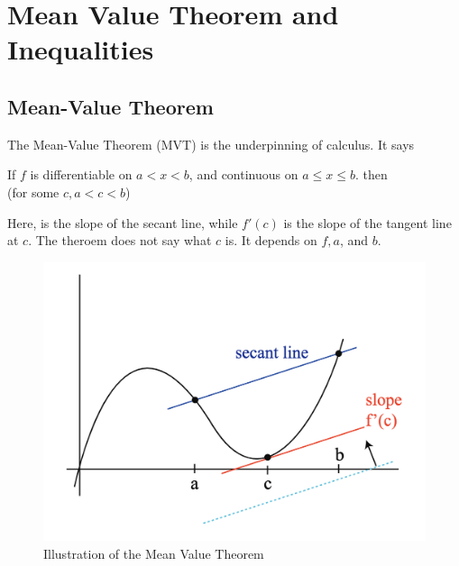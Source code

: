 

\chapter{Mean Value Theorem and Inequalities}

\bigbreak

\section{Mean-Value Theorem}

The Mean-Value Theorem (MVT) is the underpinning of calculus. It says
\begin{mdframed}
\begin{center}
	If $f$ is differentiable on $a < x < b$, and continuous on $a \leq x \leq b$. then \\
	 (for some $c, a < c < b$)
\end{center}
\end{mdframed}

Here,  is the slope of the secant line, while $f'(c)$ is the slope of the tangent line at $c$.
The theroem does not say what $c$ is. It depends on $f, a$, and $b$.

\begin{figure}[ht!]
	\centering
	\includegraphics[scale=0.7]{./images/lecture_9_figure_1.png}
	\caption{Illustration of the Mean Value Theorem}
\end{figure}

